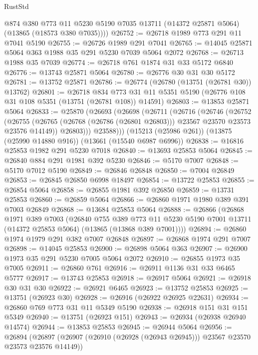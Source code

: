 \begin{lexlean}{RustStd}
\begin{coremodule}
        @874
        @380
        @773
        @11
        @5230
        @5190
        @7035
        @13711
        (@14372 @25871 @5064)
        (@13865 (@18573 @380 @7035))))
@26752 := @26718 @1989 @773 @291 @11 @7041 @5190
@26755 := @26726 @1989 @291 @7041
@26765 := @14045 @25871 @5064 @363 @1988 @35 @291 @5230 @7039 @5064 @2072
@26768 := @26713 @1988 @35 @7039
@26774 := @26718 @761 @1874 @31 @33 @5172 @6840
@26776 := @13743 @25871 @5064
@26780 := @26776 @30 @31 @30 @5172
@26781 := @13752 @25871
@26786 := @26774 (@26780 (@13751 (@26781 @30)) @13762)
@26801 := @26718
    @834
    @773
    @31
    @11
    @5351
    @5190
    (@26776 @108 @31 @108 @5351 (@13751 (@26781 @108)) @14591)
@26803 := @13853 @25871 @5064
@26833 := @25870
    (@26693
      (@26698
        (@26711
          (@26716
            (@26746
              (@26752
                (@26755
                  (@26765 (@26768 (@26786 (@26801 @26803))) @23567 @23570 @23573 @23576 @14149))
                @26803)))
          @23588)))
    (@15213 (@25986 @261))
    (@13875 (@25990 @14880 @916))
    (@13661 (@15540 @6987 @6996))
@26838 := @16816 @25853 @1982 @291 @5230 @7018
@26840 := @13693 @25853 @5064
@26845 := @26840 @884 @291 @1981 @392 @5230
@26846 := @5170 @7007
@26848 := @5170 @7012 @5190
@26849 := @26846 @26848
@26850 := @7004 @26849
@26853 := @26845 @26850 @6998 @18497
@26854 := @13722 @25853
@26855 := @26854 @5064
@26858 := @26855 @1981 @392 @26850
@26859 := @13731 @25853
@26860 := @26859 @5064
@26866 := @26860 @1971 @1980 @389 @391 @7003 @26849
@26868 := @13684 @25853 @5064
@26888 := @26866
    (@26868
      @1971
      @389
      @7003
      (@26840
        @755
        @389
        @773
        @11
        @5230
        @5190
        @7001
        @13711
        (@14372 @25853 @5064)
        (@13865 (@13868 @389 @7001))))
@26894 := @26860 @1974 @1979 @291 @382 @7007 @26848
@26897 := @26868 @1974 @291 @7007
@26898 := @14045 @25853
@26900 := @26898 @5064 @363
@26907 := @26900 @1973 @35 @291 @5230 @7005 @5064 @2072
@26910 := @26855 @1973 @35 @7005
@26911 := @26860 @761
@26916 := @26911 @1136 @31 @33 @6465 @5777
@26917 := @13743 @25853
@26918 := @26917 @5064
@26921 := @26918 @30 @31 @30
@26922 := @26921 @6465
@26923 := @13752 @25853
@26925 := @13751 (@26923 @30)
@26928 := @26916 (@26922 @26925 @22631)
@26934 := @26860 @769 @773 @31 @11 @5349 @5190
@26938 := @26918 @151 @31 @151 @5349
@26940 := @13751 (@26923 @151)
@26943 := @26934 (@26938 @26940 @14574)
@26944 := @13853 @25853
@26945 := @26944 @5064
@26956 := @26894
    (@26897 (@26907 (@26910 (@26928 (@26943 @26945))) @23567 @23570 @23573 @23576 @14149))

\end{coremodule}
\end{lexlean}
